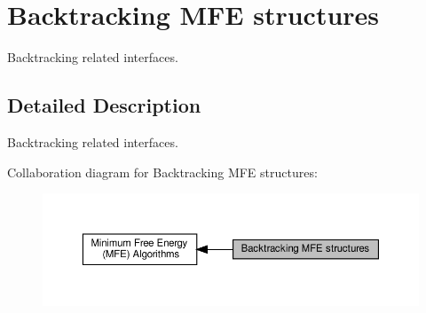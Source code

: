 \hypertarget{group__mfe__backtracking}{}\section{Backtracking M\+FE structures}
\label{group__mfe__backtracking}


Backtracking related interfaces.  




\subsection{Detailed Description}
Backtracking related interfaces. 

Collaboration diagram for Backtracking M\+FE structures\+:
\nopagebreak
\begin{figure}[H]
\begin{center}
\leavevmode
\includegraphics[width=350pt]{group__mfe__backtracking}
\end{center}
\end{figure}
